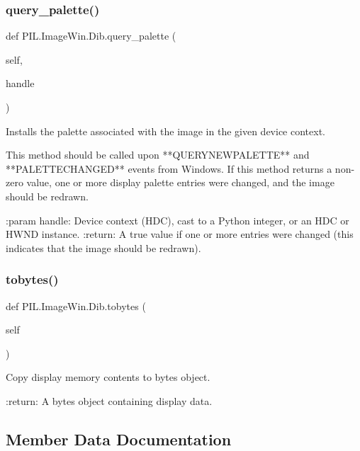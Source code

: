 \subsubsection{\texorpdfstring{query\+\_\+palette()}{query\_palette()}}
{\footnotesize\ttfamily def P\+I\+L.\+Image\+Win.\+Dib.\+query\+\_\+palette (\begin{DoxyParamCaption}\item[{}]{self,  }\item[{}]{handle }\end{DoxyParamCaption})}

\begin{DoxyVerb}Installs the palette associated with the image in the given device
context.

This method should be called upon **QUERYNEWPALETTE** and
**PALETTECHANGED** events from Windows. If this method returns a
non-zero value, one or more display palette entries were changed, and
the image should be redrawn.

:param handle: Device context (HDC), cast to a Python integer, or an
       HDC or HWND instance.
:return: A true value if one or more entries were changed (this
 indicates that the image should be redrawn).
\end{DoxyVerb}
 \mbox{\label{classPIL_1_1ImageWin_1_1Dib_a43c2e8a72116498d86954b187bb0d7eb}} 
\subsubsection{\texorpdfstring{tobytes()}{tobytes()}}
{\footnotesize\ttfamily def P\+I\+L.\+Image\+Win.\+Dib.\+tobytes (\begin{DoxyParamCaption}\item[{}]{self }\end{DoxyParamCaption})}

\begin{DoxyVerb}Copy display memory contents to bytes object.

:return: A bytes object containing display data.
\end{DoxyVerb}
 

\subsection{Member Data Documentation}
\mbox{\label{classPIL_1_1ImageWin_1_1Dib_aa58ccb286852e15a57a356cb0589c163}} 
